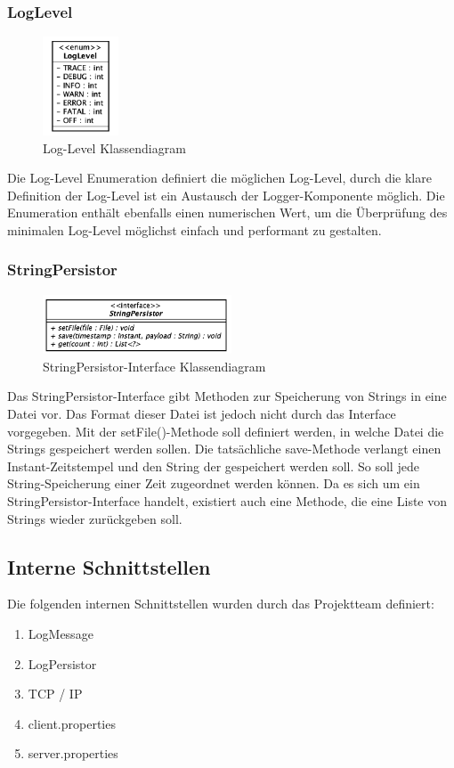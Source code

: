 \subsubsection{LogLevel}
\begin{figure}[H]
	\centering
	\includegraphics[width=0.2\textwidth]{3_Schnittstellen/Bilder/logLevel.png}
	\caption{Log-Level Klassendiagram}
	\label{fig:Log-Level Klassendiagramm}
\end{figure}
Die Log-Level Enumeration definiert die möglichen Log-Level, durch die klare Definition der Log-Level ist ein Austausch der Logger-Komponente möglich. Die Enumeration enthält ebenfalls einen numerischen Wert, um die Überprüfung des minimalen Log-Level möglichst einfach und performant zu gestalten.
\subsubsection{StringPersistor}
\begin{figure}[H]
	\centering
	\includegraphics[width=0.5\textwidth]{3_Schnittstellen/Bilder/stringPersistorInterface.png}
	\caption{StringPersistor-Interface Klassendiagram}
	\label{fig:StringPersistor-Interface Klassendiagramm}
\end{figure}
Das StringPersistor-Interface gibt Methoden zur Speicherung von Strings in eine Datei vor. Das Format dieser Datei ist jedoch nicht durch das Interface vorgegeben. Mit der setFile()-Methode soll definiert werden, in welche Datei die Strings gespeichert werden sollen. Die tatsächliche save-Methode verlangt einen Instant-Zeitstempel und den String der gespeichert werden soll. So soll jede String-Speicherung einer Zeit zugeordnet werden können. Da es sich um ein StringPersistor-Interface handelt, existiert auch eine Methode, die eine Liste von Strings wieder zurückgeben soll.
\newpage
\subsection{Interne Schnittstellen}
Die folgenden internen Schnittstellen wurden durch das Projektteam definiert: 
\begin{enumerate}
	\item LogMessage
	\item LogPersistor
	\item TCP / IP
	\item client.properties
	\item server.properties
\end{enumerate}

